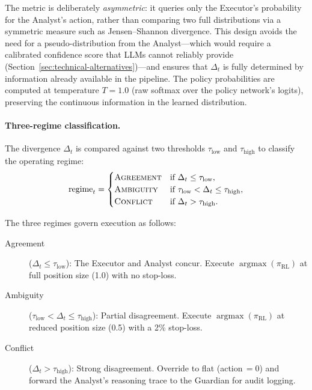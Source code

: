 The metric is deliberately \emph{asymmetric}: it queries only the
Executor's probability for the Analyst's action, rather than comparing two
full distributions via a symmetric measure such as Jensen--Shannon
divergence. This design avoids the need for a pseudo-distribution from the
Analyst---which would require a calibrated confidence score that LLMs
cannot reliably provide (Section~\ref{sec:technical-alternatives})---and
ensures that $\Delta_t$ is fully determined by information already
available in the pipeline. The policy probabilities are computed at
temperature $T = 1.0$ (raw softmax over the policy network's logits),
preserving the continuous information in the learned distribution.

\paragraph{Three-regime classification.}
The divergence $\Delta_t$ is compared against two thresholds
$\tau_{\mathrm{low}}$ and $\tau_{\mathrm{high}}$ to classify the
operating regime:
\begin{equation}
\label{eq:regimes}
  \text{regime}_t =
  \begin{cases}
    \textsc{Agreement}  & \text{if } \Delta_t \leq \tau_{\mathrm{low}}, \\
    \textsc{Ambiguity}  & \text{if } \tau_{\mathrm{low}} < \Delta_t
                          \leq \tau_{\mathrm{high}}, \\
    \textsc{Conflict}   & \text{if } \Delta_t > \tau_{\mathrm{high}}.
  \end{cases}
\end{equation}

The three regimes govern execution as follows:
\begin{description}
  \item[Agreement] ($\Delta_t \leq \tau_{\mathrm{low}}$): The Executor and
    Analyst concur. Execute $\operatorname{argmax}(\pi_{\mathrm{RL}})$ at
    full position size (1.0) with no stop-loss.
  \item[Ambiguity] ($\tau_{\mathrm{low}} < \Delta_t \leq
    \tau_{\mathrm{high}}$): Partial disagreement. Execute
    $\operatorname{argmax}(\pi_{\mathrm{RL}})$ at reduced position size
    (0.5) with a 2\% stop-loss.
  \item[Conflict] ($\Delta_t > \tau_{\mathrm{high}}$): Strong
    disagreement. Override to flat (action$\,= 0$) and forward the
    Analyst's reasoning trace to the Guardian for audit logging.
\end{description}

